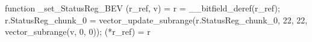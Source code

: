 function _set_StatusReg_BEV (r_ref, v) = {
    r = __bitfield_deref(r_ref);
    r.StatusReg_chunk_0 = vector_update_subrange(r.StatusReg_chunk_0, 22, 22, vector_subrange(v, 0, 0));
    (*r_ref) = r
}
